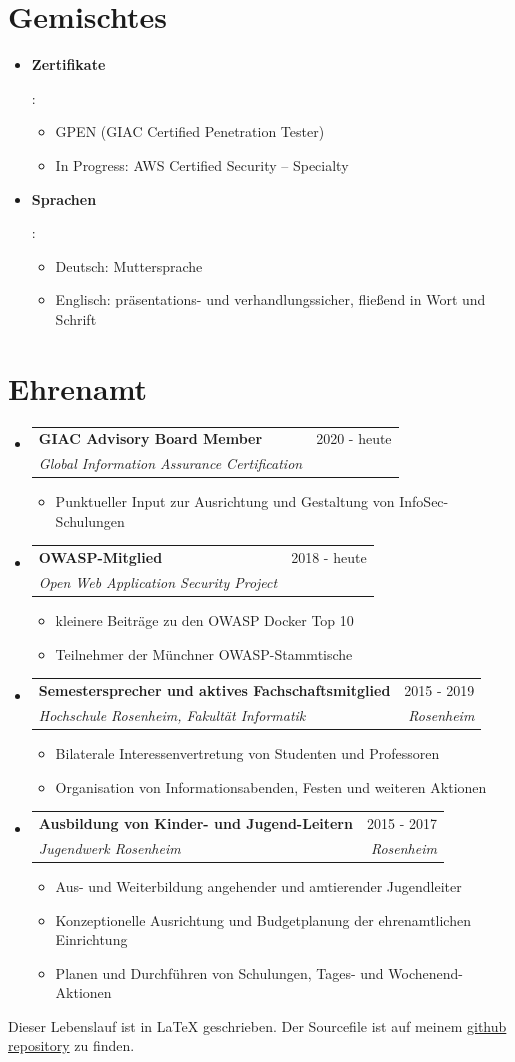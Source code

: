 \documentclass[letterpaper,11pt]{article}
\makeatletter
\newcommand{\resumeItemWithoutHeadline}[1]{
	\item\small{
		{#1 \vspace{-2pt}}
	}
}
\newcommand{\resumeSubheading}[4]{
  \vspace{-1pt}\item
    \begin{tabular*}{0.97\textwidth}[t]{l@{\extracolsep{\fill}}r}
      \textbf{#1} & #2 \\
      \textit{\small#3} & \textit{\small #4} \\
    \end{tabular*}\vspace{-5pt}
}
\newcommand{\resumeSubHeadingListStart}{\begin{itemize}[leftmargin=*]}
\newcommand{\resumeSubHeadingListEnd}{\end{itemize}}
\newcommand{\resumeItemListStart}{\begin{itemize}}
\newcommand{\resumeItemListEnd}{\end{itemize}\vspace{-5pt}}
\makeatother
\begin{document}
\section{Gemischtes}
\resumeSubHeadingListStart
\item{
	\textbf{Zertifikate}{: 
		\resumeItemListStart
		\resumeItemWithoutHeadline
		{GPEN (GIAC Certified Penetration Tester)}
		\resumeItemWithoutHeadline
		{In Progress: AWS Certified Security – Specialty}
		\resumeItemListEnd
}}
\item{
	\textbf{Sprachen}{: 	
		\resumeItemListStart
		\resumeItemWithoutHeadline
		{Deutsch: Muttersprache}
		\resumeItemWithoutHeadline
		{Englisch: präsentations- und verhandlungssicher, fließend in Wort und Schrift}
		\resumeItemListEnd
}}
\resumeSubHeadingListEnd

\section{Ehrenamt}
  \resumeSubHeadingListStart  
  	
  	\resumeSubheading
  	{GIAC Advisory Board Member}{2020 - heute}
  	{Global Information Assurance Certification}{}
  	\resumeItemListStart
  		\resumeItemWithoutHeadline
  		{Punktueller Input zur Ausrichtung und Gestaltung von InfoSec-Schulungen}
  	\resumeItemListEnd
  	
  	\resumeSubheading
  	{OWASP-Mitglied}{2018 - heute}
  	{Open Web Application Security Project}{}
  	\resumeItemListStart
  		\resumeItemWithoutHeadline
  		{kleinere Beiträge zu den OWASP Docker Top 10}
  		\resumeItemWithoutHeadline
  		{Teilnehmer der Münchner OWASP-Stammtische}
  	\resumeItemListEnd
  	  
	\resumeSubheading
	{Semestersprecher und aktives Fachschaftsmitglied}{2015 - 2019}
	{Hochschule Rosenheim, Fakultät Informatik}{Rosenheim}
	\resumeItemListStart
		\resumeItemWithoutHeadline
		{Bilaterale Interessenvertretung von Studenten und Professoren}
		\resumeItemWithoutHeadline
		{Organisation von Informationsabenden, Festen und weiteren Aktionen}
	\resumeItemListEnd
	
	\resumeSubheading
	{Ausbildung von Kinder- und Jugend-Leitern}{2015 - 2017}
	{Jugendwerk Rosenheim}{Rosenheim}
	\resumeItemListStart
		\resumeItemWithoutHeadline
		{Aus- und Weiterbildung angehender und amtierender Jugendleiter}
		\resumeItemWithoutHeadline
		{Konzeptionelle Ausrichtung und Budgetplanung der ehrenamtlichen Einrichtung}
		\resumeItemWithoutHeadline
		{Planen und Durchführen von Schulungen, Tages- und Wochenend-Aktionen}
	\resumeItemListEnd
	
  \resumeSubHeadingListEnd

\raggedleft 
\tiny{Dieser Lebenslauf ist in LaTeX geschrieben. Der Sourcefile ist auf meinem \href{https://github.com/gramsimamsi/resume/blob/master/lukas_grams_resume.tex}{github repository} zu finden. }
\end{document}
